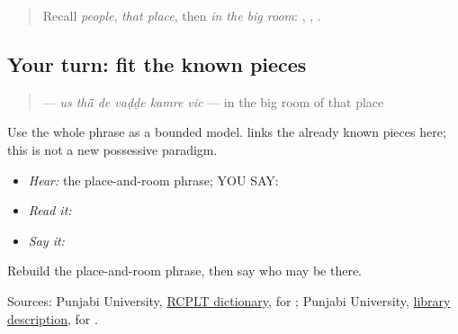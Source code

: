 \begin{quote}
Recall \emph{people}, \emph{that place}, then \emph{in the big room}: \textbf{}, \textbf{ }, \textbf{  }.
\end{quote}

\subsection*{Your turn: fit the known pieces}
\begin{quote}
\textbf{     } — \emph{us thā̃ de vaḍḍe kamre vic} — in the big room of that place
\end{quote}

Use the whole phrase as a bounded model. \textbf{} links the already known pieces here; this is not a new possessive paradigm.

\begin{itemize}
\raggedright
  \item \emph{Hear:} the place-and-room phrase; YOU SAY: \textbf{     }
  \item \emph{Read it:} \textbf{     }
  \item \emph{Say it:} \textbf{}
\end{itemize}

\begin{tcolorbox}[breakable,colback=teal!4,colframe=teal!35!black,title={Before you move on}]
Rebuild the place-and-room phrase, then say who may be there.

Sources: Punjabi University, \href{https://dic.learnpunjabi.org/default.aspx?look=\%E0\%A8\%A5\%E0\%A8\%BE\%E0\%A8\%82}{RCPLT dictionary}, for \textbf{}; Punjabi University, \href{https://punjabiuniversity.ac.in/Pages/Department.aspx?dsenc=129}{library description}, for \textbf{ }.
\end{tcolorbox}
\section[\texorpdfstring{\pa{ਲੋਕ} \pa{ਉਸ} \pa{ਥਾਂ} \pa{ਦੇ} \pa{ਵੱਡੇ} … (lok us thaan de …)}{ਲੋਕ ਉਸ ਥਾਂ ਦੇ ਵੱਡੇ … (lok us thaan de …)}]{       }

\label{lesson:PA-C180-payoff}



